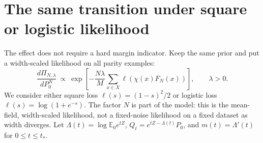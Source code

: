 \documentclass[11pt]{article}
\newcommand{\E}{\mathbb E}\newcommand{\Pp}{\mathbb P}
\begin{document}
\section{The same transition under square or logistic likelihood}
The effect does not require a hard margin indicator. Keep the same
prior and put a width-scaled likelihood on all parity examples:
\[
 \frac{d\Pi_{N,\lambda}}{dP_0^N}
 \ \propto\ \exp\left[-\frac{N\lambda}{M}
                \sum_{x\in X}\ell(\chi(x)F_N(x))\right],
 \qquad \lambda>0.
\]
We consider either square loss $\ell(s)=(1-s)^2/2$ or logistic loss
$\ell(s)=\log(1+e^{-s})$. The factor $N$ is part of the model: this
is the mean-field, width-scaled likelihood, not a fixed-noise likelihood
on a fixed dataset as width diverges.
Let $\Lambda(t)=\log\E_0e^{tZ}$, $Q_t=e^{tZ-\Lambda(t)}P_0$,
and $m(t)=\Lambda'(t)$ for $0\le t\le t_*$.
\end{document}

